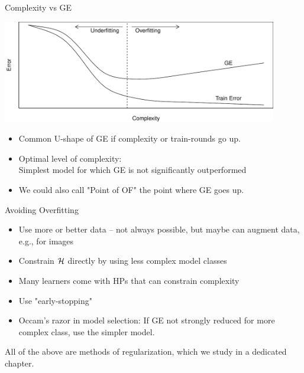 \begin{vbframe}{Complexity vs GE}

\begin{center}
\includegraphics[width = 0.9\textwidth]{figure/eval_ofit_3} 
\end{center}


\vfill

\begin{itemize}
\item Common U-shape of GE if complexity or train-rounds go up.
\item Optimal level of complexity:\\
    Simplest model for which GE is not significantly outperformed
\item We could also call "Point of OF" the point where GE goes up. 
\end{itemize}

\end{vbframe}

\begin{vbframe}{Avoiding Overfitting}

\begin{itemize}
  \item Use more or better data -- not always possible, but maybe can augment data, 
      e.g., for images
  \item Constrain $\mathcal{H}$ directly by using less complex model classes
  \item Many learners come with HPs that can 
      constrain complexity
  \item Use "early-stopping"
\item Occam's razor in model selection: 
    If GE not strongly reduced for more complex class,
    use the simpler model.
\end{itemize}

\lz

All of the above are methods of regularization,
which we study in a dedicated chapter.

\end{vbframe}

\endlecture

